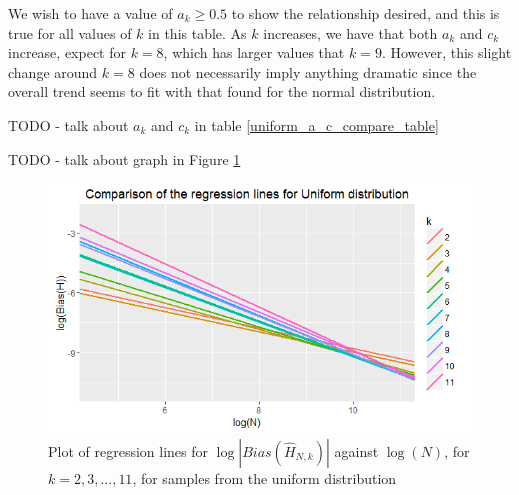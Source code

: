 \documentclass{report}
\begin{document}
We wish to have a value of $a_{k} \geq 0.5$ to show the relationship desired, and this is true for all values of $k$ in this table. As $k$ increases, we have that both $a_{k}$ and $c_{k}$ increase, expect for $k=8$, which has larger values that $k=9$. However, this slight change around $k=8$ does not necessarily imply anything dramatic since the overall trend seems to fit with that found for the normal distribution.

TODO - talk about $a_{k}$ and $c_{k}$ in table \ref{uniform_a_c_compare_table}

TODO - talk about graph in Figure \ref{uniform_comparison_graph}


\begin{figure}
  \begin{center}
    \includegraphics[width=\textwidth]{./Graphs/Best/UniformComparison.png}
  \end{center}
\caption{Plot of regression lines for $\log|Bias(\hat{H}_{N, k})|$ against $\log(N)$, for $k=2, 3,..., 11$, for samples from the uniform distribution}
  \label{uniform_comparison_graph}
\end{figure}
\end{document}
